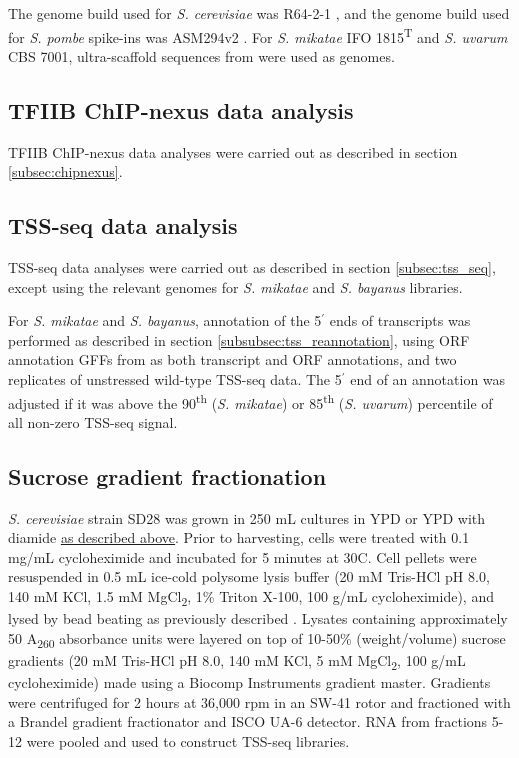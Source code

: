 The genome build used for \textit{S. cerevisiae} was R64-2-1 \citep{engel2014}, and the genome build used for \textit{S. pombe} spike-ins was ASM294v2 \citep{wood2002}.
For \textit{S. mikatae }IFO 1815\textsuperscript{T} and \textit{S. uvarum }CBS 7001, ultra-scaffold sequences from \citet{scannell11} were used as genomes.

\subsection{TFIIB ChIP-nexus data analysis}

TFIIB ChIP-nexus data analyses were carried out as described in section \ref{subsec:chipnexus}.

\subsection{TSS-seq data analysis}

TSS-seq data analyses were carried out as described in section \ref{subsec:tss_seq}, except using the relevant genomes for \textit{S. mikatae} and \textit{S. bayanus} libraries.

For \textit{S. mikatae} and \textit{S. bayanus}, annotation of the 5$^\prime$ ends of transcripts was performed as described in section \ref{subsubsec:tss_reannotation}, using ORF annotation GFFs from \citet{scannell11} as both transcript and ORF annotations, and two replicates of unstressed wild-type TSS-seq data.
The 5$^\prime$ end of an annotation was adjusted if it was above the 90\textsuperscript{th} (\textit{S. mikatae}) or 85\textsuperscript{th} (\textit{S. uvarum}) percentile of all non-zero TSS-seq signal.

\subsection{Sucrose gradient fractionation}

\textit{S. cerevisiae} strain SD28 was grown in 250 mL cultures in YPD or YPD with diamide \hyperref[subsec:stress_growth_conditions]{as described above}.
Prior to harvesting, cells were treated with 0.1 mg/mL cycloheximide and incubated for 5 minutes at 30\textdegree C.
Cell pellets were resuspended in 0.5 mL ice-cold polysome lysis buffer (20 mM Tris-HCl pH 8.0, 140 mM KCl, 1.5 mM MgCl\textsubscript{2}, 1\% Triton X-100, 100 \textmu g/mL cycloheximide), and lysed by bead beating as previously described \citep{degennaro2013}.
Lysates containing approximately 50 A\textsubscript{260} absorbance units were layered on top of 10-50\% (weight/volume) sucrose gradients (20 mM Tris-HCl pH 8.0, 140 mM KCl, 5 mM MgCl\textsubscript{2}, 100 \textmu g/mL cycloheximide) made using a Biocomp Instruments gradient master.
Gradients were centrifuged for 2 hours at 36,000 rpm in an SW-41 rotor and fractioned with a Brandel gradient fractionator and ISCO UA-6 detector.
RNA from fractions 5-12 were pooled and used to construct TSS-seq libraries.


